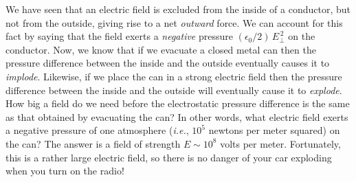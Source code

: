 We have seen that  
an electric field is excluded from the inside of a conductor, but not
from the outside, giving  rise to a net {\em outward}\/
force. We can account for this fact by saying that the field exerts a 
{\em negative} pressure
$(\epsilon_0/2)\, E_\perp^{\,2}$ on the conductor. 
Now, we know that if we evacuate a  closed metal can then the
pressure difference between the inside and the outside  eventually causes
it to {\em implode}. Likewise, if we place the can in a strong electric field then
the pressure difference between the inside and the outside will eventually cause
it to {\em explode}.
 How big a field do we need before the electrostatic pressure difference
is the same as that obtained by 
evacuating the can? In other words, what electric field exerts a negative
pressure of one atmosphere ({\em i.e.}, $10^5$ newtons per meter squared) on the can?
The answer is a field of strength $E\sim 10^8$ volts per meter. 
Fortunately, this is a rather
large electric field, so there is no danger of your  car exploding when you turn on the
radio!

